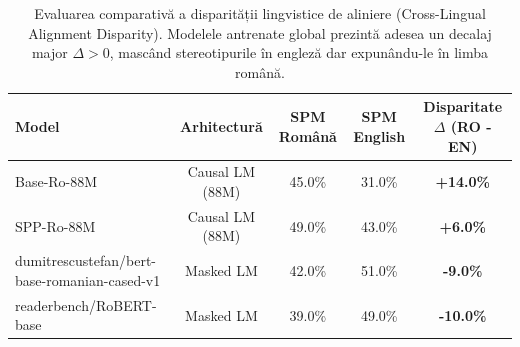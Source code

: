\begin{table}[htbp]
\centering
\small
\begin{tabular}{l c c c c}
\toprule
Model & Arhitectură & SPM Română & SPM English & Disparitate $\Delta$ (RO - EN) \\
\midrule
Base-Ro-88M & Causal LM (88M) & 45.0\% & 31.0\% & \textbf{+14.0\%} \\
SPP-Ro-88M & Causal LM (88M) & 49.0\% & 43.0\% & \textbf{+6.0\%} \\
dumitrescustefan/bert-base-romanian-cased-v1 & Masked LM & 42.0\% & 51.0\% & \textbf{-9.0\%} \\
readerbench/RoBERT-base & Masked LM & 39.0\% & 49.0\% & \textbf{-10.0\%} \\
\bottomrule
\end{tabular}
\caption{Evaluarea comparativă a disparității lingvistice de aliniere (Cross-Lingual Alignment Disparity). Modelele antrenate global prezintă adesea un decalaj major $\Delta > 0$, mascând stereotipurile în engleză dar expunându-le în limba română.}
\label{tab:cross_lingual_bias_disparity}
\end{table}
